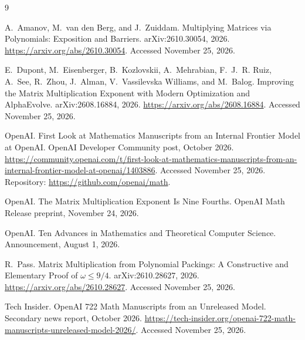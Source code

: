 \documentclass[12pt]{article}
\begin{document}
\begin{thebibliography}{9}

A.~Amanov, M.~van den Berg, and J.~Zuiddam.
\newblock Multiplying Matrices via Polynomials: Exposition and Barriers.
\newblock arXiv:2610.30054, 2026. \url{https://arxiv.org/abs/2610.30054}. Accessed November 25, 2026.

E.~Dupont, M.~Eisenberger, B.~Kozlovskii, A.~Mehrabian, F.~J.~R. Ruiz, A.~See, R.~Zhou, J.~Alman, V.~Vassilevska Williams, and M.~Balog.
\newblock Improving the Matrix Multiplication Exponent with Modern Optimization and AlphaEvolve.
\newblock arXiv:2608.16884, 2026. \url{https://arxiv.org/abs/2608.16884}. Accessed November 25, 2026.

OpenAI.
\newblock First Look at Mathematics Manuscripts from an Internal Frontier Model at OpenAI.
\newblock OpenAI Developer Community post, October 2026. \url{https://community.openai.com/t/first-look-at-mathematics-manuscripts-from-an-internal-frontier-model-at-openai/1403886}. Accessed November 25, 2026. Repository: \url{https://github.com/openai/math}.

OpenAI.
\newblock The Matrix Multiplication Exponent Is Nine Fourths.
\newblock OpenAI Math Release preprint, November 24, 2026.

OpenAI.
\newblock Ten Advances in Mathematics and Theoretical Computer Science.
\newblock Announcement, August 1, 2026.

R.~Pass.
\newblock Matrix Multiplication from Polynomial Packings: A Constructive and Elementary Proof of $\omega \le 9/4$.
\newblock arXiv:2610.28627, 2026. \url{https://arxiv.org/abs/2610.28627}. Accessed November 25, 2026.

Tech Insider.
\newblock OpenAI 722 Math Manuscripts from an Unreleased Model.
\newblock Secondary news report, October 2026. \url{https://tech-insider.org/openai-722-math-manuscripts-unreleased-model-2026/}. Accessed November 25, 2026.

\end{thebibliography}
\end{document}
